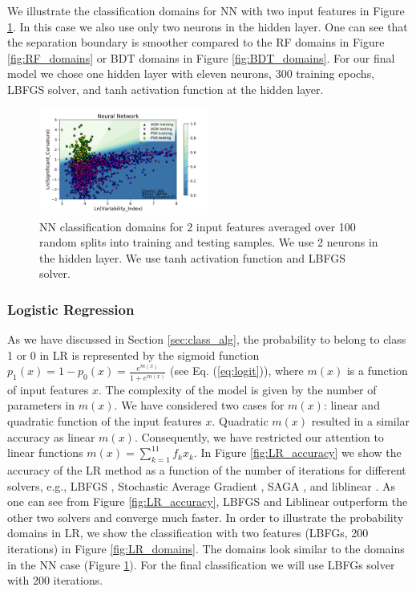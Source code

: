 We illustrate the classification domains for NN with two input features in Figure \ref{fig:NN_domains}. 
In this case we also use only two neurons in the hidden layer.
One can see that the separation boundary is smoother compared to the RF domains in Figure \ref{fig:RF_domains} or BDT domains in Figure \ref{fig:BDT_domains}.
For our final model we chose one hidden layer with eleven neurons, 300 training epochs, LBFGS solver, and tanh activation function at the hidden layer.


\begin{figure}[h]
\center
\includegraphics[width=0.5\textwidth]{plots/classification_domains/nn_300_lbfgs.pdf}
\caption{NN classification domains for 2 input features
averaged over 100 random splits into training and testing samples.
We use 2 neurons in the hidden layer. 
We use tanh activation function and LBFGS solver. 
}
\label{fig:NN_domains}
\end{figure}

\subsubsection{Logistic Regression}

As we have discussed in Section \ref{sec:class_alg}, 
the probability to belong to class 1 or 0 in LR is represented by the sigmoid function
$p_1(x) = 1 - p_0(x) = \frac{e^{m(x)}}{1 + e^{m(x)}}$ (see Eq. (\ref{eq:logit})),
where $m(x)$ is a function of input features $x$.
The complexity of the model is given by the number of parameters in $m(x)$.
We have considered two cases for $m(x)$: linear and quadratic function of the input features $x$.
Quadratic $m(x)$ resulted in a similar accuracy as linear $m(x)$.
Consequently, we have restricted our attention to linear functions $m(x) = \sum_{k = 1}^{11} f_k x_k$.
In Figure \ref{fig:LR_accuracy} we show the accuracy of the LR method as a function of the number of iterations
for different solvers, e.g., LBFGS \citep{lbfgs}, Stochastic Average Gradient \citep[SAG,][]{sag}, SAGA \citep[a variant of SAG,][]{saga},
and liblinear \citep[a special solver for LR and support vector machine classifications,][]{ll}.
As one can see from Figure \ref{fig:LR_accuracy}, LBFGS and Liblinear outperform the other two solvers and converge much faster.
In order to illustrate the probability domains in LR, we show the classification with two features (LBFGs, 200 iterations)
in Figure \ref{fig:LR_domains}. The domains look similar to the domains in the NN case (Figure \ref{fig:NN_domains}).
For the final classification we will use LBFGs solver with 200 iterations.


